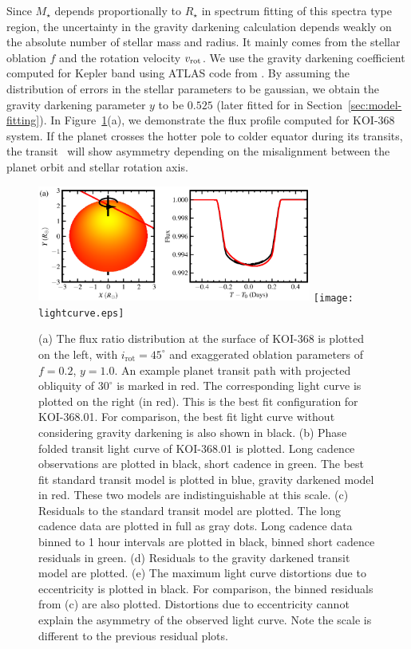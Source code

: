 \documentclass[iop]{emulateapj}
\begin{document}
Since $M_{\star}$ depends proportionally to $R_{\star}$ in spectrum fitting 
of this spectra type region, the uncertainty in the gravity darkening calculation depends weakly on the absolute number of stellar mass and radius. It mainly comes from the stellar oblation $f$ and the rotation velocity 
$v_{\rm rot}$. We use the gravity darkening coefficient computed 
for Kepler band using ATLAS code from \citet{Claret:2011}. By assuming the 
distribution of errors in the stellar parameters to be gaussian, we obtain 
the gravity darkening parameter $y$ to be $0.525$ (later fitted for in Section~\ref{sec:model-fitting}). In Figure~\ref{fig:lightcurve}(a), 
we demonstrate the flux profile computed for KOI-368 system. If the planet crosses the hotter pole to colder 
equator during its transits, the transit \lcs\ will show asymmetry depending 
on the misalignment between the planet orbit and stellar rotation axis.

\begin{figure}
  \centering
  \includegraphics[width=9cm]{obliq_model.eps}
  \texttt{[image: lightcurve.eps]}
  \caption{(a) The flux ratio distribution at the surface of KOI-368 is plotted on the left, with 
  $i_\text{rot}=45^\circ$ and exaggerated oblation parameters of $f=0.2$, $y=1.0$. An example planet transit path 
  with projected obliquity of $30^\circ$ is marked in red. The corresponding 
  light curve is plotted on the right (in red). This is the best fit configuration
  for KOI-368.01. For comparison, the best fit light curve without 
    considering gravity darkening is also shown in black. 
  (b) Phase folded transit light curve of KOI-368.01 is plotted. Long
    cadence observations are plotted in black, short cadence in
    green. The best fit standard transit model is
    plotted in blue, gravity darkened model in red. These two models are
    indistinguishable at this scale. (c) Residuals to the
    standard transit model are plotted. The long cadence data are
    plotted in full as gray dots. Long cadence data binned to 1 hour
    intervals are plotted in black, binned short cadence residuals in green. (d)
    Residuals to the gravity darkened transit model are plotted. (e) The maximum light curve 
    distortions due to eccentricity is plotted in black. For comparison, the binned 
    residuals from (c) are also plotted. Distortions due to eccentricity cannot explain 
    the asymmetry of the observed light curve. Note the scale is different to the previous residual plots. }
  \label{fig:lightcurve}
\end{figure}
\end{document}

